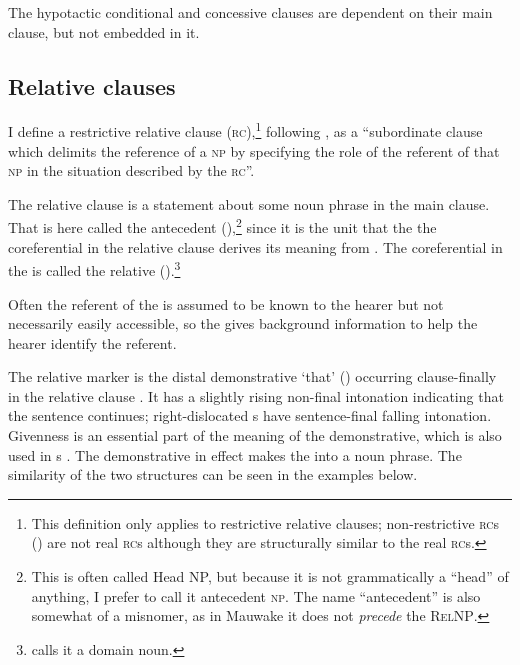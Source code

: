 The hypotactic conditional and concessive clauses are dependent on their main clause, but not embedded in it. 

\subsection{Relative clauses}  \label{sec:8.3.1}

I define a restrictive relative clause (\textsc{rc}),\footnote{This definition only applies to restrictive relative clauses; non-restrictive \textsc{rc}s () are not real \textsc{rc}s although they are structurally similar to the real \textsc{rc}s.} following \citet[206]{Andrews2007b}, as a ``subordinate clause which delimits the reference of a \textsc{np} by specifying the role of the referent of that \textsc{np} in the situation described by the \textsc{rc}''. 

The relative clause is a statement about some noun phrase in the main clause. That  is here called the antecedent  (),\footnote{This is often called Head NP, but because it is not grammatically a ``head'' of anything, I prefer to call it antecedent \textsc{np}. The name ``antecedent'' is also somewhat of a misnomer, as in Mauwake it does not \textit{precede} the \textsc{RelNP}.}  since it is the unit that the the coreferential  in the relative clause derives its meaning from \citep[20]{Crystal1997}. The coreferential  in the  is called the relative  ().\footnote{\citet[142]{Keenan1985} calls it a domain noun.}

Often the referent of the  is assumed to be known to the hearer but not necessarily easily accessible, so the  gives background information to help the hearer identify the referent. 

The relative marker is the distal demonstrative  `that' () occurring clause-finally in the relative clause . It has a slightly rising non-final intonation indicating that the sentence continues; right-dislocated s have sentence-final falling intonation. Givenness is an essential part of the meaning of the demonstrative, which is also used in s . The demonstrative in effect makes the  into a noun phrase. The similarity of the two structures can be seen in the examples below.


